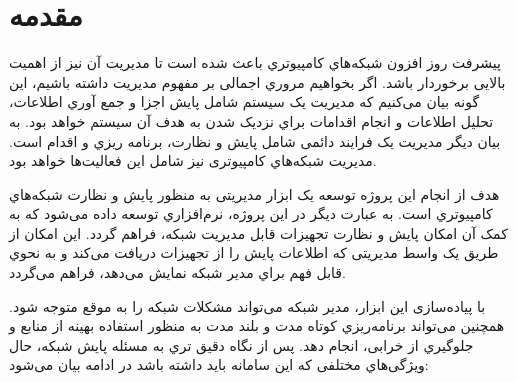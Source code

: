\chapter{مقدمه}

پیشرفت روز افزون شبکه‌هاي کامپیوتري باعث شده است تا مدیریت آن نیز از اهمیت بالایی برخوردار باشد. اگر بخواهیم مروري اجمالی بر مفهوم مدیریت داشته باشیم، این گونه بیان می‌کنیم که مدیریت یک سیستم شامل پایش اجزا و جمع آوري اطلاعات، تحلیل اطلاعات و انجام اقدامات براي نزدیک شدن به هدف آن سیستم خواهد بود. به بیان دیگر مدیریت یک فرایند دائمی شامل پایش و نظارت، برنامه ریزي و اقدام است. مدیریت شبکه‌هاي کامپیوتری نیز شامل این فعالیت‌ها خواهد بود.

هدف از انجام این پروژه توسعه یک ابزار مدیریتی به منظور پایش و نظارت شبکه‌هاي کامپیوتري است. به عبارت دیگر در این پروژه، نرم‌افزاري توسعه داده می‌شود که به کمک آن امکان پایش و نظارت تجهیزات قابل مدیریت شبکه، فراهم گردد. این امکان از طریق یک واسط مدیریتی که اطلاعات پایش را از تجهیزات دریافت می‌کند و به نحوي قابل فهم براي مدیر شبکه نمایش می‌دهد، فراهم می‌گردد.

با پیاده‌سازی این ابزار، مدیر شبکه می‌تواند مشکلات شبکه را به موقع متوجه شود. همچنین می‌تواند برنامه‌ریزي کوتاه مدت و بلند مدت به منظور استفاده بهینه از منابع و جلوگیري از خرابی، انجام دهد. پس از نگاه دقیق تري به مسئله پایش شبکه، حال ویژگی‌هاي مختلفی که این سامانه باید داشته باشد در ادامه بیان می‌شود:

